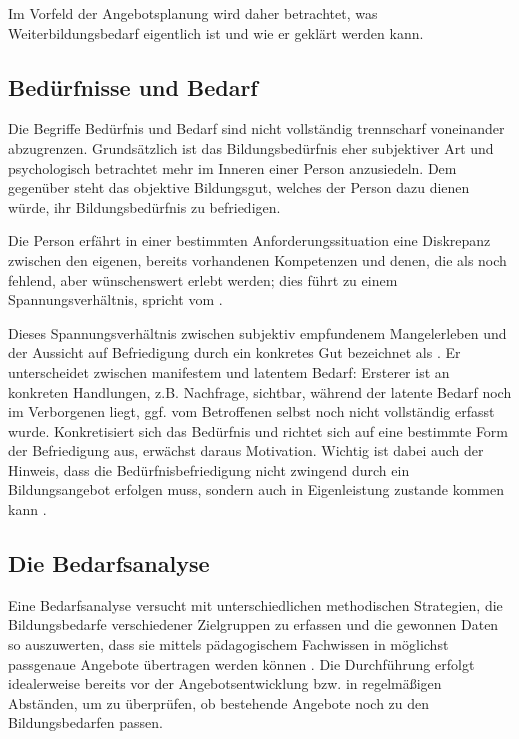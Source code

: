 \documentclass[
  twoside,
  parskip=half-,
  paper=176mm:246mm,
  BCOR=14mm,
  DIV=14,
]{scrreprt}
\begin{document}
Im Vorfeld der Angebotsplanung wird daher betrachtet, was Weiterbildungsbedarf eigentlich ist und wie er geklärt werden kann.

    \subsection{Bedürfnisse und Bedarf}

    Die Begriffe Bedürfnis und Bedarf sind nicht vollständig trennscharf voneinander abzugrenzen.  Grundsätzlich ist das Bildungsbedürfnis eher subjektiver Art und psychologisch betrachtet mehr im Inneren einer Person anzusiedeln. Dem gegenüber steht das objektive Bildungsgut, welches der Person dazu dienen würde, ihr Bildungsbedürfnis zu befriedigen. 

    Die Person erfährt in einer bestimmten Anforderungssituation eine Diskrepanz zwischen den eigenen, bereits vorhandenen Kompetenzen und denen, die als noch fehlend, aber wünschenswert erlebt werden; dies führt zu einem Spannungsverhältnis, \citeauthor{schlutz} spricht vom  \autocite[42]{schlutz}.

    Dieses Spannungsverhältnis zwischen subjektiv empfundenem Mangelerleben und der Aussicht auf Befriedigung durch ein konkretes Gut bezeichnet \citeauthor{schlutz} als . Er unterscheidet zwischen manifestem und latentem Bedarf: Ersterer ist an konkreten Handlungen, z.B. Nachfrage, sichtbar, während der latente Bedarf noch im Verborgenen liegt, ggf. vom Betroffenen selbst noch nicht vollständig erfasst wurde. Konkretisiert sich das Bedürfnis und richtet sich auf eine bestimmte Form der Befriedigung aus, erwächst daraus Motivation. Wichtig ist dabei auch der Hinweis, dass die Bedürfnisbefriedigung nicht zwingend durch ein Bildungsangebot erfolgen muss, sondern auch in Eigenleistung zustande kommen kann \autocite[vgl.][41]{schlutz}.
    
    \subsection{Die Bedarfsanalyse}

Eine Bedarfsanalyse versucht mit unterschiedlichen methodischen Strategien, die Bildungsbedarfe verschiedener Zielgruppen zu erfassen und die gewonnen Daten so auszuwerten, dass sie mittels pädagogischem Fachwissen in möglichst passgenaue Angebote übertragen werden können \autocite[vgl.][5]{kos}. Die Durchführung erfolgt idealerweise bereits vor der Angebotsentwicklung bzw. in regelmäßigen Abständen, um zu überprüfen, ob bestehende Angebote noch zu den Bildungsbedarfen passen.
\end{document}
